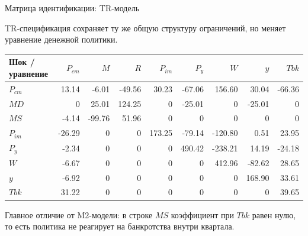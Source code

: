 \begin{frame}[t]{Матрица идентификации: TR-модель}
\footnotesize

TR-спецификация сохраняет ту же общую структуру ограничений, но меняет уравнение денежной политики.

\vspace{0.35em}

\begin{center}
\scriptsize
\setlength{\tabcolsep}{2.8pt}
\renewcommand{\arraystretch}{1.15}

\begin{tabular}{@{}lrrrrrrrr@{}}
\toprule
Шок / уравнение & $P_{cm}$ & $M$ & $R$ & $P_{im}$ & $P_y$ & $W$ & $y$ & $Tbk$ \tabularnewline
\midrule
$P_{cm}$ & 13.14 & -6.01 & -49.56 & 30.23 & -67.06 & 156.60 & 30.04 & -66.36 \tabularnewline
$MD$     & 0 & 25.01 & 124.25 & 0 & -25.01 & 0 & -25.01 & 0 \tabularnewline
$MS$     & -4.14 & -99.76 & 51.96 & 0 & 0 & 0 & 0 & 0 \tabularnewline
$P_{im}$ & -26.29 & 0 & 0 & 173.25 & -79.14 & -120.80 & 0.51 & 23.95 \tabularnewline
$P_y$    & -2.34 & 0 & 0 & 0 & 490.42 & -238.21 & 14.19 & -24.18 \tabularnewline
$W$      & -6.67 & 0 & 0 & 0 & 0 & 412.96 & -82.62 & 28.65 \tabularnewline
$y$      & -6.92 & 0 & 0 & 0 & 0 & 0 & 168.90 & 33.61 \tabularnewline
$Tbk$    & 31.22 & 0 & 0 & 0 & 0 & 0 & 0 & 39.65 \tabularnewline
\bottomrule
\end{tabular}
\end{center}

\vspace{0.35em}

\footnotesize
Главное отличие от M2-модели: в строке $MS$ коэффициент при $Tbk$ равен нулю, то есть политика не реагирует на банкротства внутри квартала.

\end{frame}
